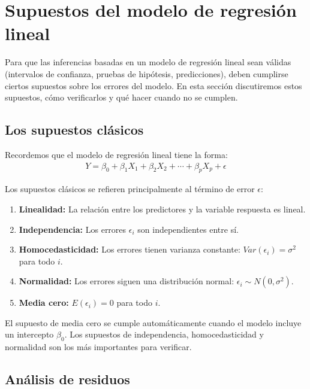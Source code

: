 \section{Supuestos del modelo de regresión lineal}

Para que las inferencias basadas en un modelo de regresión lineal sean válidas (intervalos de confianza, pruebas de hipótesis, predicciones), deben cumplirse ciertos supuestos sobre los errores del modelo. En esta sección discutiremos estos supuestos, cómo verificarlos y qué hacer cuando no se cumplen.

\subsection{Los supuestos clásicos}

Recordemos que el modelo de regresión lineal tiene la forma:
\begin{align}
	Y = \beta_0 + \beta_1 X_1 + \beta_2 X_2 + \cdots + \beta_p X_p + \epsilon
\end{align}

Los supuestos clásicos se refieren principalmente al término de error $\epsilon$:

\begin{enumerate}
	\item \textbf{Linealidad:} La relación entre los predictores y la variable respuesta es lineal.
	\item \textbf{Independencia:} Los errores $\epsilon_i$ son independientes entre sí.
	\item \textbf{Homocedasticidad:} Los errores tienen varianza constante: $Var(\epsilon_i) = \sigma^2$ para todo $i$.
	\item \textbf{Normalidad:} Los errores siguen una distribución normal: $\epsilon_i \sim N(0, \sigma^2)$.
	\item \textbf{Media cero:} $E(\epsilon_i) = 0$ para todo $i$.
\end{enumerate}

\begin{observacion}
	El supuesto de media cero se cumple automáticamente cuando el modelo incluye un intercepto $\beta_0$. Los supuestos de independencia, homocedasticidad y normalidad son los más importantes para verificar.
\end{observacion}

\subsection{Análisis de residuos}

